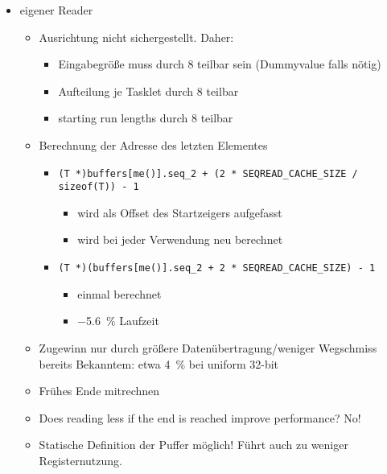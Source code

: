 \begin{itemize}
	\item
	eigener Reader
	\begin{itemize}
		\item
		Ausrichtung nicht sichergestellt. Daher:
		\begin{itemize}
			\item
			Eingabegröße muss durch 8 teilbar sein (Dummyvalue falls nötig)

			\item
			Aufteilung je Tasklet durch 8 teilbar

			\item
			starting run lengths durch 8 teilbar
		\end{itemize}

		\item
		Berechnung der Adresse des letzten Elementes
		\begin{itemize}
			\item
			\lstinline|(T *)buffers[me()].seq_2 + (2 * SEQREAD_CACHE_SIZE / sizeof(T)) - 1|
			\begin{itemize}
				\item
				wird als Offset des Startzeigers aufgefasst

				\item
				wird bei jeder Verwendung neu berechnet
			\end{itemize}

			\item
			\lstinline|(T *)(buffers[me()].seq_2 + 2 * SEQREAD_CACHE_SIZE) - 1|
			\begin{itemize}
				\item
				einmal berechnet

				\item
				\qty{-5,6}{\percent} Laufzeit
			\end{itemize}
		\end{itemize}

		\item
		Zugewinn nur durch größere Datenübertragung/weniger Wegschmiss bereits Bekanntem: etwa \qty{4}{\percent} bei uniform 32-bit

		\item
		Frühes Ende mitrechnen

		\item
		Does reading less if the end is reached improve performance? No!

		\item
		Statische Definition der Puffer möglich!
		Führt auch zu weniger Registernutzung.
	\end{itemize}


\end{itemize}
